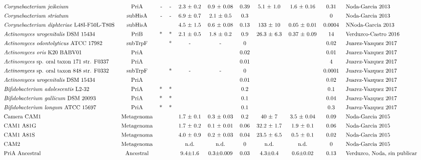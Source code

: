 \documentclass[12pt,twoside]{reedthesis}
\begin{document}
\begin{landscape}
$${\begin{tabular}{ l c r c c c c c c c l}
  \textit{Corynebacterium} \textit{jeikeium} &PriA&-&-&2.3 ± 0.2&0.9 ± 0.08&0.39&5.1 ± 1.0&1.6 ± 0.16&0.31& Noda-Garcia 2013\\ [1ex]    
  \textit{Corynebacterium} \textit{striatum} &subHisA&-&-&6.9 ± 0.7&2.1 ± 0.5&0.3&&&0& Noda-Garcia 2013 \\ [1ex]    
  \textit{Corynebacterium} \textit{diphteriae}  L48I-F50L-T80S&subHisA&&&4.5 ± 1.5&0.6 ± 0.08&0.13&133 ± 10&0.05 ± 0.01&0.0004&NNoda-Garcia 2013\\ [1ex]    
  \textit{Actinomyces} \textit{urogenitalis} DSM 15434&PriB&*&*&2.1 ± 0.5 &1.8 ± 0.2 &0.9&26.3 ± 6.3& 0.37 ± 0.09 &14&Verduzco-Castro 2016\\ [1ex]   
  \textit{Actinomyces} \textit{odontolyticus}  ATCC 17982&subTrpF&&*&-&-&0&&&0.02&Juarez-Vazquez 2017\\ [1ex]    
  \textit{Actinomyces} \textit{oris} K20 BABV01&PriA&&&&&0.02&&&0.01&Juarez-Vazquez 2017\\ [1ex]    
  \textit{Actinomyces} sp. oral taxon 171 str. F0337&PriA&&&&&0.01&&&4&Juarez-Vazquez 2017\\ [1ex]    
  \textit{Actinomyces} sp. oral taxon 848 str. F0332&subTrpF&&*&-&-&0&&&0.0001&Juarez-Vazquez 2017\\ [1ex]    
  \textit{Actinomyces} \textit{urogenitalis} DSM 15434&PriA&&&&&0.01&&&0.02&Juarez-Vazquez 2017\\ [1ex]    
  \textit{Bifidobacterium} \textit{adolescentis} L2-32&PriA&*&*&&&0.2&&&0.1&Juarez-Vazquez 2017\\ [1ex]    
  \textit{Bifidobacterium} \textit{gallicum} DSM 20093 &PriA&*&*&&&0.1&&&0.04&Juarez-Vazquez 2017\\ [1ex]    
  \textit{Bifidobacterium} \textit{longum} ATCC 15697&PriA&*&*&&&0.1&&&0.3&Juarez-Vazquez 2017\\ [1ex]    
  Camera CAM1&Metagenoma&&&1.7 ± 0.1&0.3 ± 0.03&0.2&40 ± 7&3.5 ± 0.04&0.09&Noda-Garcia 2015\\ [1ex]    
  CAM1 A81G&Metagenoma&&&1.7 ± 0.2&0.1 ± 0.01&0.06&32.2 ± 1.7&1.9 ± 0.1&0.06&Noda-Garcia 2015\\ [1ex]    
  CAM1 A81S&Metagenoma&&&4.0 ± 0.9&0.2 ± 0.03&0.04&23.5 ± 6.5&0.5 ± 0.1&0.02&Noda-Garcia 2015\\ [1ex]    
  CAM2&Metagenoma&&&n.d.&n.d.&0&n.d.&n.d.&0&Noda-Garcia 2015\\ [1ex]    
  PriA Ancestral&Ancestral&&&9.4±1.6&0.3±0.009&0.03&4.3±0.4&0.6±0.02&0.13&Verduzco, Noda, sin publicar\\ [1ex]    

\end{tabular}}$$
\end{landscape}
\end{document}
